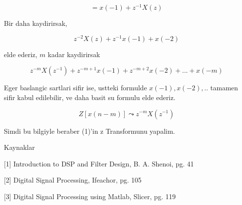 \documentclass[12pt,fleqn]{article}
\begin{document}
\[ = x(-1) + z^{-1}X(z)\]

Bir daha kaydirirsak, 

\[ z^{-2}X(z) + z^{-1}x(-1) + x(-2) \]

elde ederiz, $m$ kadar kaydirirsak

\[ z^{-m}X(z^{-1}) + z^{-m+1}x(-1) + z^{-m+2}x(-2) + ... + x(-m) \]

Eger baslangic sartlari sifir ise, ustteki formulde $x(-1),x(-2),..$
tamamen sifir kabul edilebilir, ve daha basit su formulu elde ederiz. 

\[ Z[x(n-m)] \leadsto z^{-m}X(z^{-1})\]

Simdi bu bilgiyle beraber (1)'in z Transformunu yapalim. 










Kaynaklar

[1] Introduction to DSP and Filter Design, B. A. Shenoi, pg. 41

[2] Digital Signal Processing, Ifeachor, pg. 105

[3] Digital Signal Processing using Matlab, Slicer, pg. 119
\end{document}
